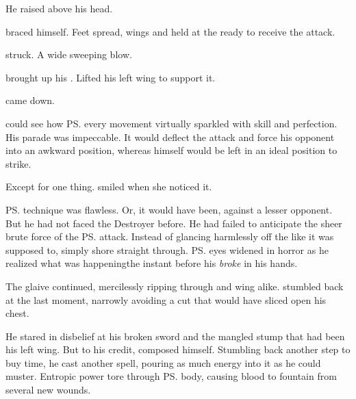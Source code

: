 \begin{garbage}
He raised \Rystessakhin{} above his head. 

\Teshrial{} braced himself. 
Feet spread, wings and \senaan{} held at the ready to receive the attack. 

\Ishnaruchaefir{} struck. 
A wide sweeping blow. 

\Teshrial{} brought up his \senaan. 
Lifted his left wing to support it. 

\Rystessakhin{} came down. 

\Criseis{} could see how \ps{\Teshrial} every movement virtually sparkled with skill and perfection. 
His parade was impeccable. 
It would deflect the attack and force his opponent into an awkward position, whereas \Teshrial{} himself would be left in an ideal position to strike. 

Except for one thing. 
\Criseis{} smiled when she noticed it. 

%   
%   

\ps{\Teshrial} technique was flawless. 
Or, it would have been, against a lesser opponent. 
But he had not faced the Destroyer before. 
He had failed to anticipate the sheer brute force of the \ps{\dragonlord} attack. 
Instead of glancing harmlessly off the \senaan{} like it was supposed to, \Rystessakhin{} simply shore straight through. 
\ps{\Teshrial} eyes widened in horror as he realized what was happening\prikker the instant before his \senaan{} \emph{broke} in his hands. 

The glaive continued, mercilessly ripping through \kilghan{} and wing alike. 
\Teshrial{} stumbled back at the last moment, narrowly avoiding a cut that would have sliced open his chest. 

He stared in disbelief at his broken sword and the mangled stump that had been his left wing. 
But to his credit, \Teshrial{} composed himself. 
Stumbling back another step to buy time, he cast another spell, pouring as much energy into it as he could muster. 
Entropic power tore through \ps{\Ishnaruchaefir} body, causing blood to fountain from several new wounds. 


\end{garbage}
